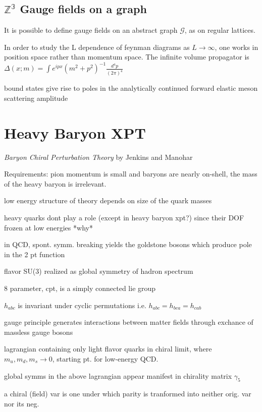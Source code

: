 \documentclass[12pt,tightenlines, raggedbottom, prd, notitlepage]{revtex4-1}
\begin{document}
\subsection*{$\mathbb{Z^3}$ Gauge fields on a graph}

It is possible to define gauge fields on an abstract graph $\mathcal{G}$, as on regular lattices. 

In order to study the L dependence of feynman diagrams as $L\rightarrow \infty$, one works in position
space rather than momentum space. The infinite volume propagator is 
$\Delta(x;m) = \int e^{ipx}(m^2 + p^2)^{-1}\frac{d^4p}{(2\pi)^4}$

bound states give rise to poles in the analytically continued forward elastic meson scattering amplitude 


\section*{Heavy Baryon XPT}
\textit{Baryon Chiral Perturbation Theory} by Jenkins and Manohar

Requirements: pion momentum is small and baryons are nearly on-shell, the mass of the heavy baryon is irrelevant.






low energy structure of theory depends on size of the quark masses

heavy quarks dont play a role (except in heavy baryon xpt?) since their DOF frozen at low energies *why*

in QCD, spont. symm. breaking yields the goldstone bosons which produce pole in the 2 pt function 

flavor SU(3) realized as global symmetry of hadron spectrum 

8 parameter, cpt, is a simply connected lie group 

$h_{abc}$ is invariant under cyclic permutations i.e. $h_{abc} = h_{bca} = h_{cab}$

gauge principle generates interactions between matter fields through exchance of massless gauge bosons 

lagrangian containing only light flavor quarks in chiral limit, where $m_u, m_d, m_s \rightarrow 0$, starting pt. for low-energy QCD. 

global symms in the above lagrangian appear manifest in chirality matrix $\gamma_5$

a chiral (field) var is one under which parity is tranformed into neither orig. var nor its neg. 
\end{document}
